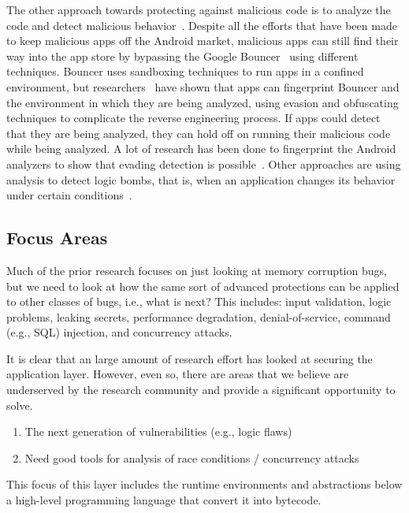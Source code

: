 \documentclass[11pt,letterpaper]{article}
\begin{document}
The other approach towards protecting against malicious code is to analyze the code and detect malicious behavior~\cite{Zhou2012}. Despite all the efforts that have been made to keep malicious apps off the Android market, malicious apps can still find their way into the app store by bypassing the Google Bouncer~\cite{Lockheimer:2012} using different techniques. Bouncer uses sandboxing techniques to run apps in a confined environment, but researchers~\cite{oberheide2012dissecting} have shown that apps can fingerprint Bouncer and the environment in which they are being analyzed, using evasion and obfuscating techniques to complicate the reverse engineering process. If apps could detect that they are being analyzed, they can hold off on running their malicious code while being analyzed. A lot of research has been done to fingerprint the Android analyzers to show that evading detection is possible~\cite{Maier2014,Jing2014,Vidas2014}. Other approaches are using analysis to detect logic bombs, that is, when an application changes its behavior under certain conditions~\cite{Fratantonio2016}.

\subsection{Focus Areas}

Much of the prior research focuses on just looking at memory
corruption bugs, but we need to look at how the same sort of advanced
protections can be applied to other classes of bugs, i.e., what is
next? This includes: input validation, logic problems, leaking
secrets, performance degradation, denial-of-service, command (e.g.,
SQL) injection, and concurrency attacks.


It is clear that an large amount of research effort has looked at
securing the application layer. However, even so, there are areas that
we believe are underserved by the research community and provide a
significant opportunity to solve.

\begin{enumerate}
	\item The next generation of vulnerabilities (e.g., logic flaws)
	\item Need good tools for analysis of race conditions / concurrency attacks
\end{enumerate}

This focus of this layer includes the runtime environments and abstractions
below a high-level programming language that convert it into bytecode.
\end{document}
